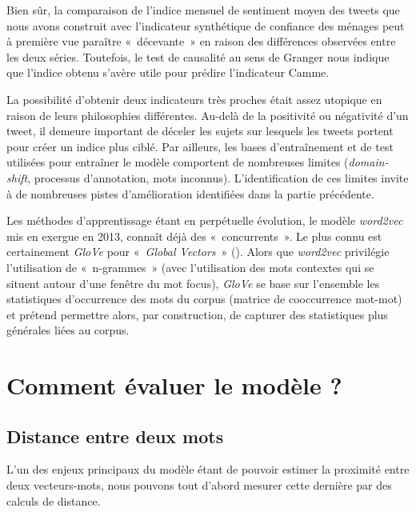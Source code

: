 \documentclass[11pt,french,french]{article}
\begin{document}
Bien sûr, la comparaison de l'indice mensuel de sentiment moyen des
tweets que nous avons construit avec l'indicateur synthétique de
confiance des ménages peut à première vue paraître «~décevante~» en
raison des différences observées entre les deux séries. Toutefois, le
test de causalité au sens de Granger nous indique que l'indice obtenu
s'avère utile pour prédire l'indicateur Camme.

La possibilité d'obtenir deux indicateurs très proches était assez
utopique en raison de leurs philosophies différentes. Au-delà de la
positivité ou négativité d'un tweet, il demeure important de déceler les
sujets sur lesquels les tweets portent pour créer un indice plus ciblé.
Par ailleurs, les bases d'entraînement et de test utilisées pour
entraîner le modèle comportent de nombreuses limites
(\emph{domain-shift}, processus d'annotation, mots inconnus).
L'identification de ces limites invite à de nombreuses pistes
d'amélioration identifiées dans la partie précédente.

Les méthodes d'apprentissage étant en perpétuelle évolution, le modèle
\emph{word2vec} mis en exergue en 2013, connaît déjà des
«~concurrents~». Le plus connu est certainement \emph{GloVe} pour
«~\emph{Global Vectors}~» (\cite{Pennington}). Alors que \emph{word2vec}
privilégie l'utilisation de «~n-grammes~» (avec l'utilisation des mots
contextes qui se situent autour d'une fenêtre du mot focus),
\emph{GloVe} se base sur l'ensemble les statistiques d'occurrence des
mots du corpus (matrice de cooccurrence mot-mot) et prétend permettre
alors, par construction, de capturer des statistiques plus générales
liées au corpus.

\newpage

\appendix



\section{Comment évaluer le modèle ?}\label{annexe:commentEvaluer}

\subsection{Distance entre deux mots}\label{distance-entre-deux-mots}

L'un des enjeux principaux du modèle étant de pouvoir estimer la
proximité entre deux vecteurs-mots, nous pouvons tout d'abord mesurer
cette dernière par des calculs de distance.
\end{document}
